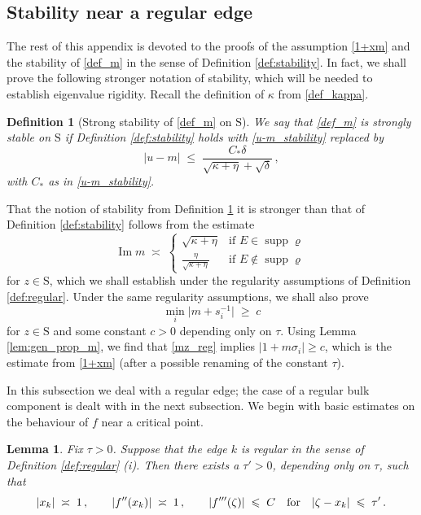 \documentclass[11pt]{article} %
\numberwithin{equation}{section}
\numberwithin{figure}{section}
\theoremstyle{plain} %
\newtheorem{lemma}[theorem]{Lemma}
\newtheorem{definition}[theorem]{Definition}
\theoremstyle{definition} %
\newcommand{\f}[1]{\boldsymbol{\mathrm{#1}}} %
\newcommand{\txt}[1]{\text{\rm{#1}}}
\renewcommand{\leq}{\leqslant}
\renewcommand{\geq}{\geqslant}
\newcommand{\abs}[1]{\lvert #1 \rvert}
\DeclareMathOperator{\supp}{supp}
\DeclareMathOperator{\im}{Im}
\begin{document}
\subsection{Stability near a regular edge}
The rest of this appendix is devoted to the proofs of the assumption \eqref{1+xm} and the stability of \eqref{def_m} in the sense of Definition \ref{def:stability}. In fact, we shall prove the following stronger notation of stability, which will be needed to establish eigenvalue rigidity. Recall the definition of $\kappa$ from \eqref{def_kappa}.
\begin{definition}[Strong stability of \eqref{def_m} on $\f S$] \label{def:strong_stab}
We say that \eqref{def_m} is \emph{strongly stable on} $\f S$ if Definition \ref{def:stability} holds with \eqref{u-m_stability} replaced by
\begin{equation} \label{strong_stab}
\abs{u - m} \;\leq\; \frac{C_* \delta}{\sqrt{\kappa + \eta} +  \sqrt{\delta}}\,,
\end{equation}
with $C_*$ as in \eqref{u-m_stability}.
\end{definition}
That the notion of stability from Definition \ref{def:strong_stab} it is stronger than that of Definition \ref{def:stability} follows from the estimate
\begin{equation} \label{m_sq_root}
\im m \;\asymp\; 
\begin{cases}
\sqrt{\kappa + \eta} & \text{if $E \in \supp \varrho$}
\\
\frac{\eta}{\sqrt{\kappa + \eta}} & \text{if $E \notin \supp \varrho$}
\end{cases}
\end{equation}
for $z \in \f S$, which we shall establish under the regularity assumptions of Definition \ref{def:regular}. Under the same regularity assumptions, we shall also prove
\begin{equation} \label{mz_reg}
\min_i \abs{m + s_i^{-1}} \;\geq\; c
\end{equation}
for $z \in \f S$ and some constant $c > 0$ depending only on $\tau$. Using Lemma \ref{lem:gen_prop_m}, we find that \eqref{mz_reg} implies $\abs{1 + m \sigma_i} \geq c$, which is the estimate from \eqref{1+xm} (after a possible renaming of the constant $\tau$).

In this subsection we deal with a regular edge; the case of a regular bulk component is dealt with in the next subsection.
We begin with basic estimates on the behaviour of $f$ near a critical point.

\begin{lemma} \label{lem:edge_tools}
Fix $\tau > 0$. Suppose that the edge $k$ is regular in the sense of Definition \ref{def:regular} (i). Then there exists a $\tau' > 0$, depending only on $\tau$, such that
\begin{equation} \label{f_der_est}
\abs{x_k} \;\asymp\; 1\,, \qquad \abs{f''(x_k)} \;\asymp\; 1\,, \qquad \abs{f'''(\zeta)} \;\leq\; C \quad \txt{for} \quad \abs{\zeta - x_k} \;\leq\; \tau'\,.
\end{equation}
\end{lemma}
\end{document}
